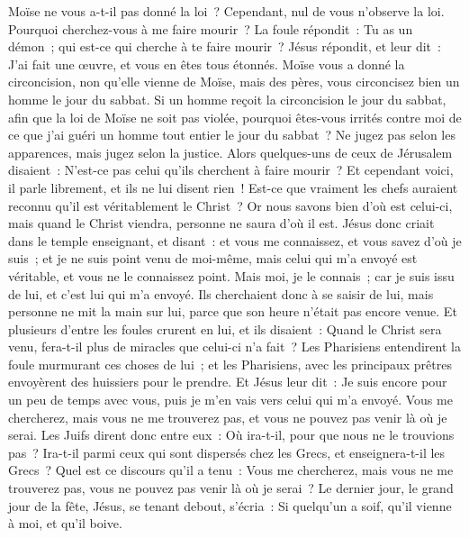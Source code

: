 \begin{multicols}{2}
Moïse ne vous a-t-il pas donné la loi~? Cependant, nul de vous n'observe la loi. Pourquoi cherchez-vous à me faire mourir~?
La foule répondit~: Tu as un démon~; qui est-ce qui cherche à te faire mourir~?
Jésus répondit, et leur dit~: J'ai fait une œuvre, et vous en êtes tous étonnés.
Moïse vous a donné la circoncision, non qu'elle vienne de Moïse, mais des pères, vous circoncisez bien un homme le jour du sabbat.
Si un homme reçoit la circoncision le jour du sabbat, afin que la loi de Moïse ne soit pas violée, pourquoi êtes-vous irrités contre moi de ce que j'ai guéri un homme tout entier le jour du sabbat~?
Ne jugez pas selon les apparences, mais jugez selon la justice.
Alors quelques-uns de ceux de Jérusalem disaient~: N'est-ce pas celui qu'ils cherchent à faire mourir~?
Et cependant voici, il parle librement, et ils ne lui disent rien~! Est-ce que vraiment les chefs auraient reconnu qu'il est véritablement le Christ~?
Or nous savons bien d'où est celui-ci, mais quand le Christ viendra, personne ne saura d'où il est.
Jésus donc criait dans le temple enseignant, et disant~: et vous me connaissez, et vous savez d'où je suis~; et je ne suis point venu de moi-même, mais celui qui m'a envoyé est véritable, et vous ne le connaissez point. 
Mais moi, je le connais~; car je suis issu de lui, et c'est lui qui m'a envoyé.
Ils cherchaient donc à se saisir de lui, mais personne ne mit la main sur lui, parce que son heure n'était pas encore venue.
Et plusieurs d'entre les foules crurent en lui, et ils disaient~: Quand le Christ sera venu, fera-t-il plus de miracles que celui-ci n'a fait~?
Les Pharisiens entendirent la foule murmurant ces choses de lui~; et les Pharisiens, avec les principaux prêtres envoyèrent des huissiers pour le prendre.
Et Jésus leur dit~: Je suis encore pour un peu de temps avec vous, puis je m'en vais vers celui qui m'a envoyé.
Vous me chercherez, mais vous ne me trouverez pas, et vous ne pouvez pas venir là où je serai.
Les Juifs dirent donc entre eux~: Où ira-t-il, pour que nous ne le trouvions pas~? Ira-t-il parmi ceux qui sont dispersés chez les Grecs, et enseignera-t-il les Grecs~?
Quel est ce discours qu'il a tenu~: Vous me chercherez, mais vous ne me trouverez pas, vous ne pouvez pas venir là où je serai~?
Le dernier jour, le grand jour de la fête, Jésus, se tenant debout, s'écria~: Si quelqu'un a soif, qu'il vienne à moi, et qu'il boive.

\end{multicols}

